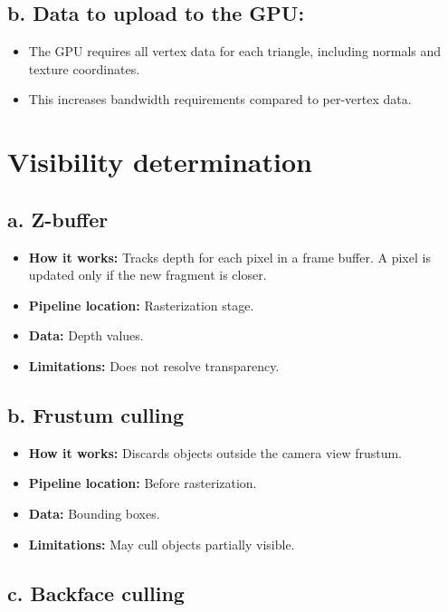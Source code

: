 \documentclass{article}
\begin{document}
\subsection{b. Data to upload to the GPU:}
\begin{itemize}
    \item The GPU requires all vertex data for each triangle, including normals and texture coordinates.
    \item This increases bandwidth requirements compared to per-vertex data.
\end{itemize}

\section{Visibility determination}

\subsection{a. Z-buffer}

\begin{itemize}
    \item \textbf{How it works:} Tracks depth for each pixel in a frame buffer. A pixel is updated only if the new fragment is closer.
    \item \textbf{Pipeline location:} Rasterization stage.
    \item \textbf{Data:} Depth values.
    \item \textbf{Limitations:} Does not resolve transparency.
\end{itemize}

\subsection{b. Frustum culling}

\begin{itemize}
    \item \textbf{How it works:} Discards objects outside the camera view frustum.
    \item \textbf{Pipeline location:} Before rasterization.
    \item \textbf{Data:} Bounding boxes.
    \item \textbf{Limitations:} May cull objects partially visible.
\end{itemize}

\subsection{c. Backface culling}
\end{document}
